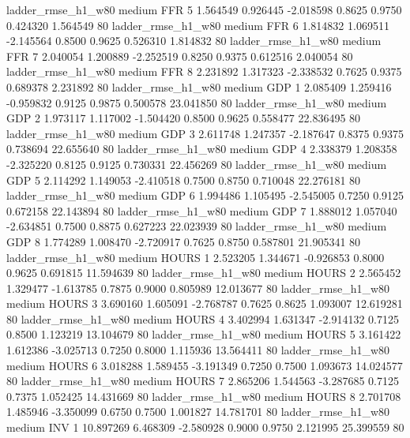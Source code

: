     ladder_rmse_h1_w80     medium      FFR                 5  1.564549 0.926445 -2.018598 0.8625 0.9750  0.424320    1.564549 80
    ladder_rmse_h1_w80     medium      FFR                 6  1.814832 1.069511 -2.145564 0.8500 0.9625  0.526310    1.814832 80
    ladder_rmse_h1_w80     medium      FFR                 7  2.040054 1.200889 -2.252519 0.8250 0.9375  0.612516    2.040054 80
    ladder_rmse_h1_w80     medium      FFR                 8  2.231892 1.317323 -2.338532 0.7625 0.9375  0.689378    2.231892 80
    ladder_rmse_h1_w80     medium      GDP                 1  2.085409 1.259416 -0.959832 0.9125 0.9875  0.500578   23.041850 80
    ladder_rmse_h1_w80     medium      GDP                 2  1.973117 1.117002 -1.504420 0.8500 0.9625  0.558477   22.836495 80
    ladder_rmse_h1_w80     medium      GDP                 3  2.611748 1.247357 -2.187647 0.8375 0.9375  0.738694   22.655640 80
    ladder_rmse_h1_w80     medium      GDP                 4  2.338379 1.208358 -2.325220 0.8125 0.9125  0.730331   22.456269 80
    ladder_rmse_h1_w80     medium      GDP                 5  2.114292 1.149053 -2.410518 0.7500 0.8750  0.710048   22.276181 80
    ladder_rmse_h1_w80     medium      GDP                 6  1.994486 1.105495 -2.545005 0.7250 0.9125  0.672158   22.143894 80
    ladder_rmse_h1_w80     medium      GDP                 7  1.888012 1.057040 -2.634851 0.7500 0.8875  0.627223   22.023939 80
    ladder_rmse_h1_w80     medium      GDP                 8  1.774289 1.008470 -2.720917 0.7625 0.8750  0.587801   21.905341 80
    ladder_rmse_h1_w80     medium    HOURS                 1  2.523205 1.344671 -0.926853 0.8000 0.9625  0.691815   11.594639 80
    ladder_rmse_h1_w80     medium    HOURS                 2  2.565452 1.329477 -1.613785 0.7875 0.9000  0.805989   12.013677 80
    ladder_rmse_h1_w80     medium    HOURS                 3  3.690160 1.605091 -2.768787 0.7625 0.8625  1.093007   12.619281 80
    ladder_rmse_h1_w80     medium    HOURS                 4  3.402994 1.631347 -2.914132 0.7125 0.8500  1.123219   13.104679 80
    ladder_rmse_h1_w80     medium    HOURS                 5  3.161422 1.612386 -3.025713 0.7250 0.8000  1.115936   13.564411 80
    ladder_rmse_h1_w80     medium    HOURS                 6  3.018288 1.589455 -3.191349 0.7250 0.7500  1.093673   14.024577 80
    ladder_rmse_h1_w80     medium    HOURS                 7  2.865206 1.544563 -3.287685 0.7125 0.7375  1.052425   14.431669 80
    ladder_rmse_h1_w80     medium    HOURS                 8  2.701708 1.485946 -3.350099 0.6750 0.7500  1.001827   14.781701 80
    ladder_rmse_h1_w80     medium      INV                 1 10.897269 6.468309 -2.580928 0.9000 0.9750  2.121995   25.399559 80
